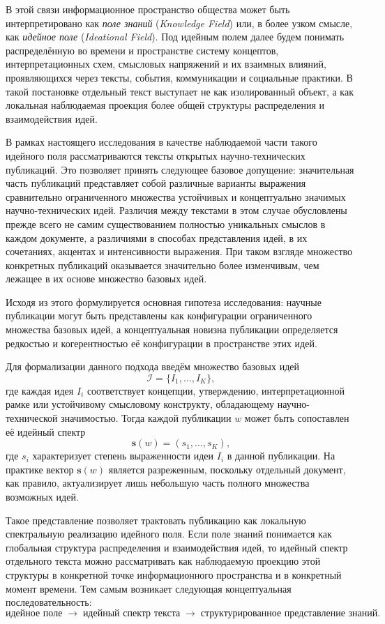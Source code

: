 \documentclass[review,3p,times]{elsarticle}
\begin{document}
В этой связи информационное пространство общества может быть интерпретировано как \emph{поле знаний} (\emph{Knowledge Field}) или, в более узком смысле, как \emph{идейное поле} (\emph{Ideational Field}). Под идейным полем далее будем понимать распределённую во времени и пространстве систему концептов, интерпретационных схем, смысловых напряжений и их взаимных влияний, проявляющихся через тексты, события, коммуникации и социальные практики. В такой постановке отдельный текст выступает не как изолированный объект, а как локальная наблюдаемая проекция более общей структуры распределения и взаимодействия идей.

В рамках настоящего исследования в качестве наблюдаемой части такого идейного поля рассматриваются тексты открытых научно-технических публикаций. Это позволяет принять следующее базовое допущение: значительная часть публикаций представляет собой различные варианты выражения сравнительно ограниченного множества устойчивых и концептуально значимых научно-технических идей. Различия между текстами в этом случае обусловлены прежде всего не самим существованием полностью уникальных смыслов в каждом документе, а различиями в способах представления идей, в их сочетаниях, акцентах и интенсивности выражения. При таком взгляде множество конкретных публикаций оказывается значительно более изменчивым, чем лежащее в их основе множество базовых идей.

Исходя из этого формулируется основная гипотеза исследования: научные публикации могут быть представлены как конфигурации ограниченного множества базовых идей, а концептуальная новизна публикации определяется редкостью и когерентностью её конфигурации в пространстве этих идей.

Для формализации данного подхода введём множество базовых идей
\[
\mathcal{I}=\{I_1,\dots,I_K\},
\]
где каждая идея $I_i$ соответствует концепции, утверждению, интерпретационной рамке или устойчивому смысловому конструкту, обладающему научно-технической значимостью. Тогда каждой публикации $w$ может быть сопоставлен её идейный спектр
\[
\mathbf{s}(w)=(s_1,\dots,s_K),
\]
где $s_i$ характеризует степень выраженности идеи $I_i$ в данной публикации. На практике вектор $\mathbf{s}(w)$ является разреженным, поскольку отдельный документ, как правило, актуализирует лишь небольшую часть полного множества возможных идей.

Такое представление позволяет трактовать публикацию как локальную спектральную реализацию идейного поля. Если поле знаний понимается как глобальная структура распределения и взаимодействия идей, то идейный спектр отдельного текста можно рассматривать как наблюдаемую проекцию этой структуры в конкретной точке информационного пространства и в конкретный момент времени. Тем самым возникает следующая концептуальная последовательность:
\[
\text{идейное поле}
\;\rightarrow\;
\text{идейный спектр текста}
\;\rightarrow\;
\text{структурированное представление знаний}.
\]
\end{document}
